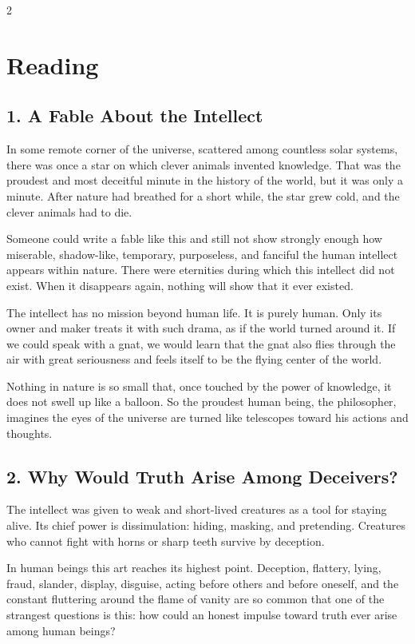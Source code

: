 \documentclass[12pt]{article}
\begin{document}
\begin{multicols}{2}
\raggedcolumns
\section*{Reading}

\subsection*{1. A Fable About the Intellect}
In some remote corner of the universe, scattered among countless solar systems, there was once a star on which clever animals invented knowledge. That was the proudest and most deceitful minute in the history of the world, but it was only a minute. After nature had breathed for a short while, the star grew cold, and the clever animals had to die.

Someone could write a fable like this and still not show strongly enough how miserable, shadow-like, temporary, purposeless, and fanciful the human intellect appears within nature. There were eternities during which this intellect did not exist. When it disappears again, nothing will show that it ever existed.

The intellect has no mission beyond human life. It is purely human. Only its owner and maker treats it with such drama, as if the world turned around it. If we could speak with a gnat, we would learn that the gnat also flies through the air with great seriousness and feels itself to be the flying center of the world.

Nothing in nature is so small that, once touched by the power of knowledge, it does not swell up like a balloon. So the proudest human being, the philosopher, imagines the eyes of the universe are turned like telescopes toward his actions and thoughts.

\subsection*{2. Why Would Truth Arise Among Deceivers?}
The intellect was given to weak and short-lived creatures as a tool for staying alive. Its chief power is dissimulation: hiding, masking, and pretending. Creatures who cannot fight with horns or sharp teeth survive by deception.

In human beings this art reaches its highest point. Deception, flattery, lying, fraud, slander, display, disguise, acting before others and before oneself, and the constant fluttering around the flame of vanity are so common that one of the strangest questions is this: how could an honest impulse toward truth ever arise among human beings?


\end{multicols}
\end{document}

